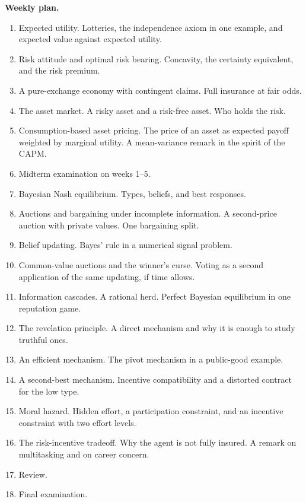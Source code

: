 \documentclass[11pt]{article}
\begin{document}
\textbf{Weekly plan.}
\begin{enumerate}
\item Expected utility. Lotteries, the independence axiom in one example, and expected value against expected utility.
\item Risk attitude and optimal risk bearing. Concavity, the certainty equivalent, and the risk premium.
\item A pure-exchange economy with contingent claims. Full insurance at fair odds.
\item The asset market. A risky asset and a risk-free asset. Who holds the risk.
\item Consumption-based asset pricing. The price of an asset as expected payoff weighted by marginal utility. A mean-variance remark in the spirit of the CAPM.
\item Midterm examination on weeks 1--5.
\item Bayesian Nash equilibrium. Types, beliefs, and best responses.
\item Auctions and bargaining under incomplete information. A second-price auction with private values. One bargaining split.
\item Belief updating. Bayes' rule in a numerical signal problem.
\item Common-value auctions and the winner's curse. Voting as a second application of the same updating, if time allows.
\item Information cascades. A rational herd. Perfect Bayesian equilibrium in one reputation game.
\item The revelation principle. A direct mechanism and why it is enough to study truthful ones.
\item An efficient mechanism. The pivot mechanism in a public-good example.
\item A second-best mechanism. Incentive compatibility and a distorted contract for the low type.
\item Moral hazard. Hidden effort, a participation constraint, and an incentive constraint with two effort levels.
\item The risk-incentive tradeoff. Why the agent is not fully insured. A remark on multitasking and on career concern.
\item Review.
\item Final examination.
\end{enumerate}
\end{document}
